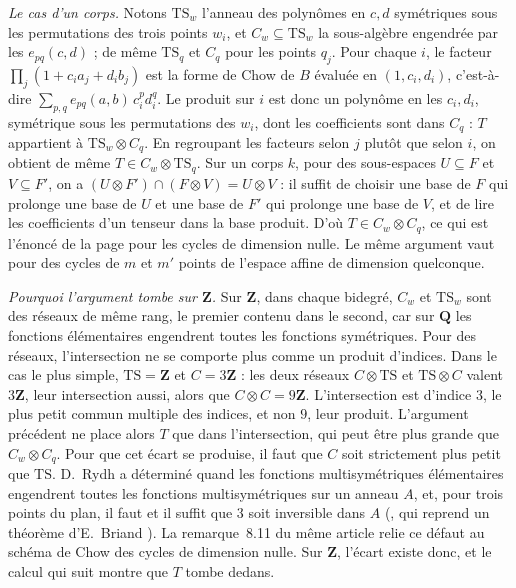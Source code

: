 \emph{Le cas d'un corps.} Notons $\mathrm{TS}_w$ l'anneau des polynômes en $c, d$ symétriques sous les permutations des trois points $w_i$, et $C_w \subseteq \mathrm{TS}_w$ la sous-algèbre engendrée par les $e_{pq}(c, d)$ ; de même $\mathrm{TS}_q$ et $C_q$ pour les points $q_j$. Pour chaque $i$, le facteur $\prod_j (1 + c_i a_j + d_i b_j)$ est la forme de Chow de $B$ évaluée en $(1, c_i, d_i)$, c'est-à-dire $\sum_{p,q} e_{pq}(a, b)\, c_i^p d_i^q$. Le produit sur $i$ est donc un polynôme en les $c_i, d_i$, symétrique sous les permutations des $w_i$, dont les coefficients sont dans $C_q$ : $T$ appartient à $\mathrm{TS}_w \otimes C_q$. En regroupant les facteurs selon $j$ plutôt que selon $i$, on obtient de même $T \in C_w \otimes \mathrm{TS}_q$. Sur un corps $k$, pour des sous-espaces $U \subseteq F$ et $V \subseteq F'$, on a $(U \otimes F') \cap (F \otimes V) = U \otimes V$ : il suffit de choisir une base de $F$ qui prolonge une base de $U$ et une base de $F'$ qui prolonge une base de $V$, et de lire les coefficients d'un tenseur dans la base produit. D'où $T \in C_w \otimes C_q$, ce qui est l'énoncé de la page pour les cycles de dimension nulle. Le même argument vaut pour des cycles de $m$ et $m'$ points de l'espace affine de dimension quelconque.

\emph{Pourquoi l'argument tombe sur $\mathbf Z$.} Sur $\mathbf Z$, dans chaque bidegré, $C_w$ et $\mathrm{TS}_w$ sont des réseaux de même rang, le premier contenu dans le second, car sur $\mathbf Q$ les fonctions élémentaires engendrent toutes les fonctions symétriques. Pour des réseaux, l'intersection ne se comporte plus comme un produit d'indices. Dans le cas le plus simple, $\mathrm{TS} = \mathbf Z$ et $C = 3\mathbf Z$ : les deux réseaux $C \otimes \mathrm{TS}$ et $\mathrm{TS} \otimes C$ valent $3\mathbf Z$, leur intersection aussi, alors que $C \otimes C = 9\mathbf Z$. L'intersection est d'indice $3$, le plus petit commun multiple des indices, et non $9$, leur produit. L'argument précédent ne place alors $T$ que dans l'intersection, qui peut être plus grande que $C_w \otimes C_q$. Pour que cet écart se produise, il faut que $C$ soit strictement plus petit que $\mathrm{TS}$. D.~Rydh a déterminé quand les fonctions multisymétriques élémentaires engendrent toutes les fonctions multisymétriques sur un anneau $A$, et, pour trois points du plan, il faut et il suffit que $3$ soit inversible dans $A$ (\cite[corollaire~8.10]{rydh2007}, qui reprend un théorème d'E.~Briand \cite{briand2004}). La remarque~8.11 du même article relie ce défaut au schéma de Chow des cycles de dimension nulle. Sur $\mathbf Z$, l'écart existe donc, et le calcul qui suit montre que $T$ tombe dedans.

